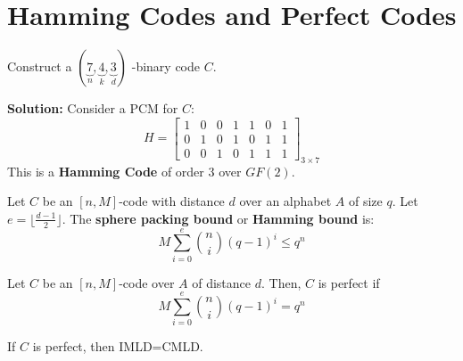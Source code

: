 \section{Hamming Codes and Perfect Codes}

\begin{exbox}
    \begin{example}
        Construct a $ (\underbrace{7}_{n},\underbrace{4}_{k},\underbrace{3}_{d}) $
        -binary code $ C $.

        \textbf{Solution:}
        Consider a PCM for $ C $:
        \[H= \left[
                \begin{array}{ccc|cccc}
                    1 & 0 & 0 & 1 & 1 & 0 & 1 \\
                    0 & 1 & 0 & 1 & 0 & 1 & 1 \\
                    0 & 0 & 1 & 0 & 1 & 1 & 1
                \end{array} \right]_{3\times 7} \]
        This is a \textbf{Hamming Code} of order $ 3 $ over $ GF(2) $.
    \end{example}
\end{exbox}

\begin{defbox}
    \begin{definition}
        Let $ C $ be an $ [n,M] $-code with distance $ d $ over an
        alphabet $ A $ of size $ q $. Let $ e=\lfloor \frac{d-1}{2} \rfloor $.
        The \textbf{sphere packing bound} or \textbf{Hamming bound} is:
        \[ M \sum\limits_{i=0}^{e} \binom{n}{i}(q-1)^i\leqslant q^n \]
    \end{definition} \end{defbox}

\begin{defbox}
    \begin{definition}
        Let $ C $ be an $ [n,M] $-code over $ A $ of distance $ d $. Then,
        $ C $ is perfect if
        \[ M \sum\limits_{i=0}^{e} \binom{n}{i}(q-1)^i = q^n \]
    \end{definition} \end{defbox}

 If $ C $ is perfect, then IMLD=CMLD.
